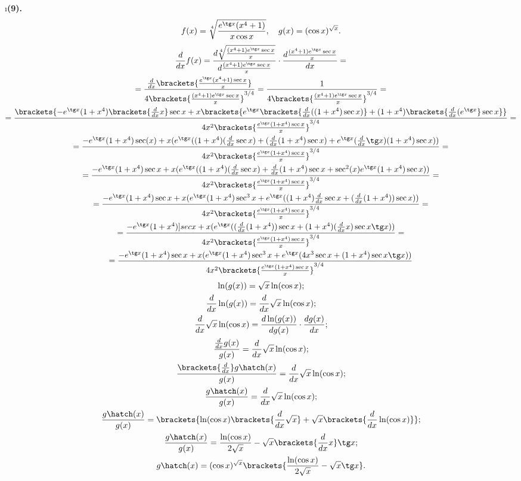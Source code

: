 \i \textbf{(9).}
\begin{gather*}
    f(x) = \sqrt[4]{\frac{e^{\tg x}(x^4+1)}{x\cos x}}, \quad
    g(x) = (\cos x)^{\sqrt{x}}.
\end{gather*}
\pu
\begin{gather*}
    \frac{d}{dx}f(x) = \frac{d\sqrt[4]{\frac{(x^4+1)e^{\tg x}\sec x}{x}}}{d\frac{(x^4+1)e^{\tg x}\sec x}{x}} \cdot \frac{d\frac{(x^4+1)e^{\tg x}\sec x}{x}}{dx} = \\
     = \frac{\frac{d}{dx}\brackets{\frac{e^{\tg x}(x^4+1)\sec x}{x}}}{4\brackets{\frac{(x^4+1)e^{\tg x}\sec x}{x}}^{3/4}} = 
    \frac{1}{4\brackets{\frac{(x^4+1)e^{\tg x}\sec x}{x}}^{3/4}} = \\
    = \frac{\brackets{-e^{\tg x}(1+x^4)\brackets{\frac{d}{dx}x}\sec x + x \brackets{e^{\tg x}\brackets{\frac{d}{dx}((1+x^4)\sec x)} + (1+x^4)\brackets{\frac{d}{dx}(e^{\tg x}}\sec x}}} {4x^2\brackets{\frac{e^{\tg x}(1+x^4)\sec x}{x}}^{3/4}} = \\
    = \frac{-e^{\tg x}(1+x^4)\sec(x) + x(e^{\tg x}((1+x^4)(\frac{d}{dx}\sec x) + (\frac{d}{dx}(1+x^4)\sec x) + e^{\tg x}(\frac{d}{dx}\tg x)(1+x^4)\sec x))} {4x^2\brackets{\frac{e^{\tg x}(1+x^4)\sec x}{x}}^{3/4}} = \\
    = \frac{-e^{\tg x}(1+x^4)\sec x + x(e^{\tg x}((1+x^4)(\frac{d}{dx}\sec x) + \frac{d}{dx}(1+x^4)\sec x + \sec^2(x) e^{\tg x}(1+x^4)\sec x))} {4x^2\brackets{\frac{e^{\tg x}(1+x^4)\sec x}{x}}^{3/4}} = \\
    = \frac{-e^{\tg x}(1+x^4)\sec x + x(e^{\tg x}(1+x^4)\sec^3x + e^{\tg x}((1+x^4)\frac{d}{dx}\sec x + (\frac{d}{dx}(1+x^4))\sec x))} {4x^2\brackets{\frac{e^{\tg x}(1+x^4)\sec x}{x}}^{3/4}} = \\
    = \frac{-e^{\tg x}(1+x^4)]sec x + x(e^{\tg x} ((\frac{d}{dx}(1+x^4))\sec x + (1+x^4)(\frac{d}{dx}x)\sec x \tg x))} {4x^2\brackets{\frac{e^{\tg x}(1+x^4)\sec x}{x}}^{3/4}} = \\
    = \frac{-e^{\tg x}(1+x^4)\sec x + x(e^{\tg x}(1+x^4)\sec^3 x + e^{\tg x}(4x^3\sec x + (1+x^4)\sec x \tg x))} {4x^2\brackets{\frac{e^{\tg x}(1+x^4)\sec x}{x}}^{3/4}}
\end{gather*}
\pu
\begin{gather*}
    \ln(g(x)) = \sqrt{x}\ln(\cos x);\\
    \frac{d}{dx}\ln(g(x)) = \frac{d}{dx}\sqrt{x}\ln(\cos x);\\
    \frac{d}{dx}\sqrt{x}\ln(\cos x) = \frac{d\ln(g(x))}{dg(x)}\cdot\frac{dg(x)}{dx};\\
    \frac{\frac{d}{dx}g(x)}{g(x)} = \frac{d}{dx}\sqrt{x}\ln(\cos x);\\
    \frac{\brackets{\frac{d}{dx}}g\hatch(x)}{g(x)} = \frac{d}{dx}\sqrt{x}\ln(\cos x);\\
    \frac{g\hatch(x)}{g(x)} = \frac{d}{dx}\sqrt{x}\ln(\cos x);\\
    \frac{g\hatch(x)}{g(x)} = \brackets{\ln(\cos x)\brackets{\frac{d}{dx}\sqrt{x}} + \sqrt{x}\brackets{\frac{d}{dx}\ln(\cos x)}};\\
    \frac{g\hatch(x)}{g(x)} = \frac{\ln(\cos x)}{2\sqrt{x}} - \sqrt{x}\brackets{\frac{d}{dx}x}\tg x;\\
    g\hatch(x) = (\cos x)^{\sqrt{x}}\brackets{\frac{\ln(\cos x)}{2\sqrt{x}} - \sqrt{x}\tg x}.
\end{gather*}
